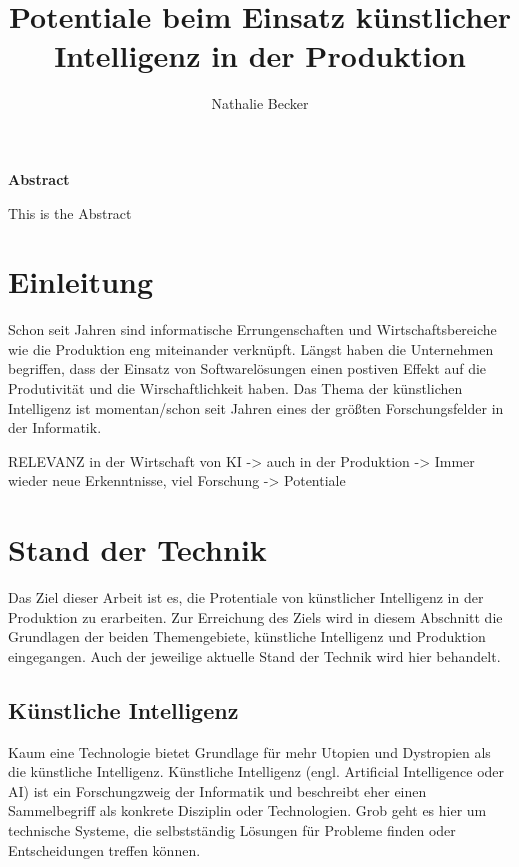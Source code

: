 \documentclass[a4paper,12pt, german]{report}
\begin{document}
\title{Potentiale beim Einsatz künstlicher Intelligenz in der Produktion}
\author{Nathalie Becker}


\begin{titlepage}
\maketitle
\end{titlepage}


\begin{center}
\textbf{Abstract}
\end{center}
This is the Abstract


\tableofcontents
\printacronyms

\chapter{Einleitung}

Schon seit Jahren sind informatische Errungenschaften und Wirtschaftsbereiche wie die Produktion eng miteinander verknüpft. Längst haben die Unternehmen begriffen, dass der Einsatz von Softwarelösungen einen postiven Effekt auf die Produtivität und die Wirschaftlichkeit haben.
Das Thema der künstlichen Intelligenz ist momentan/schon seit Jahren eines der größten Forschungsfelder in der Informatik. 

RELEVANZ in der Wirtschaft von KI -> auch in der Produktion -> Immer wieder neue Erkenntnisse, viel Forschung -> Potentiale 


\chapter{Stand der Technik}

Das Ziel dieser Arbeit ist es, die Protentiale von künstlicher Intelligenz in der Produktion zu erarbeiten. Zur Erreichung des Ziels wird in diesem Abschnitt die Grundlagen der beiden Themengebiete, künstliche Intelligenz und Produktion eingegangen. Auch der jeweilige aktuelle Stand der Technik wird hier behandelt.

\section{Künstliche Intelligenz}

Kaum eine Technologie bietet Grundlage für mehr Utopien und Dystropien als die künstliche Intelligenz. 
Künstliche Intelligenz (engl. Artificial Intelligence oder AI) ist ein Forschungzweig der Informatik und beschreibt eher einen Sammelbegriff als konkrete Disziplin oder Technologien. Grob geht es hier um technische Systeme, die selbstständig Lösungen für Probleme finden oder Entscheidungen treffen können. \cite{01} %
\end{document}
